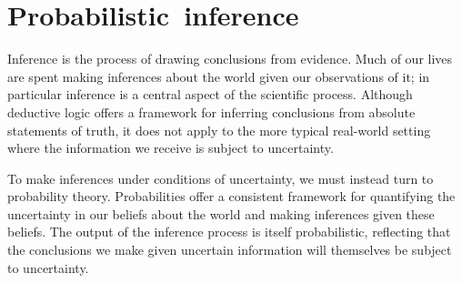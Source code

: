 \chapter{\mbox{Probabilistic inference}}\label{ch:probabilistic-inference}

Inference is the process of drawing conclusions from evidence. Much of our lives are spent making inferences about the world given our observations of it; in particular inference is a central aspect of the scientific process. Although deductive logic offers a framework for inferring conclusions from absolute statements of truth, it does not apply to the more typical real-world setting where the information we receive is subject to uncertainty. 

To make inferences under conditions of uncertainty, we must instead turn to probability theory. Probabilities offer a consistent framework for quantifying the uncertainty in our beliefs about the world and making inferences given these beliefs. The output of the inference process is itself probabilistic, reflecting that the conclusions we make given uncertain information will themselves be subject to uncertainty. 


